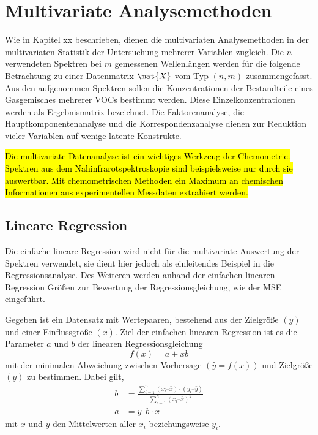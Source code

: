 \section{Multivariate Analysemethoden} \label{sec:MVA2}
Wie in Kapitel xx beschrieben, dienen die multivariaten Analysemethoden in der multivariaten Statistik der Untersuchung mehrerer Variablen zugleich.
Die $n$ verwendeten Spektren bei $m$ gemessenen Wellenlängen werden für die folgende Betrachtung zu einer Datenmatrix $\mat{X}$ vom Typ $(n,m)$ zusammengefasst.
Aus den aufgenommen Spektren sollen die Konzentrationen der Bestandteile eines Gasgemisches mehrerer \gls{VOC}s bestimmt werden.
Diese Einzelkonzentrationen werden als Ergebnismatrix bezeichnet.
Die Faktorenanalyse, die Hauptkomponentenanalyse und die Korrespondenzanalyse dienen zur Reduktion vieler Variablen auf wenige latente Konstrukte.

\hl{Die multivariate Datenanalyse ist ein wichtiges Werkzeug der Chemometrie.
Spektren aus dem Nahinfrarotspektroskopie sind beispielsweise nur durch sie auswertbar.
Mit chemometrischen Methoden ein Maximum an chemischen Informationen aus experimentellen Messdaten extrahiert werden.}


\subsection{Lineare Regression}
Die einfache lineare Regression wird nicht für die multivariate Auswertung der Spektren verwendet, sie dient hier jedoch als einleitendes Beispiel in die Regressionsanalyse.
Des Weiteren werden anhand der einfachen linearen Regression Größen zur Bewertung der Regressionsgleichung, wie  der \gls{MSE} eingeführt.

Gegeben ist ein Datensatz mit Wertepaaren, bestehend aus der Zielgröße $(y)$ und einer Einflussgröße $(x)$.
Ziel der einfachen linearen Regression ist es die Parameter $a$ und $b$ der linearen Regressionsgleichung
\begin{equation}\label{eq:linearreg}
    f(x) = a +xb
\end{equation}
mit der minimalen Abweichung zwischen Vorhersage $(\hat{y} = f(x))$ und Zielgröße $(y)$ zu bestimmen.
Dabei gilt,
\begin{subequations}
    \begin{align}
        b &= \frac{\sum_{i=1}^n (x_i – \bar{x}) \cdot (y_i – \bar{y})}{\sum_{i=1}^n (x_i – \bar{x})^2}\\
        a &= \bar{y} – b\cdot \bar{x}
    \end{align}
\end{subequations}
mit $\bar{x}$ und $\bar{y}$ den Mittelwerten aller $x_i$ beziehungsweise $y_i$.

